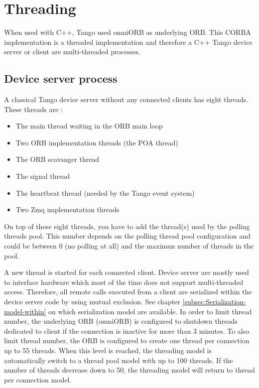 \section{Threading\label{sec:Threading}}

When used with C++, Tango used omniORB as underlying ORB. This CORBA
implementation is a threaded implementation and therefore a C++ Tango
device server or client are multi-threaded processes.

\subsection{Device server process}

A classical Tango device server without any connected clients has
eight threads. These threads are :
\begin{itemize}
\item The main thread waiting in the ORB main loop
\item Two ORB implementation threads (the POA thread)
\item The ORB scavanger thread
\item The signal thread
\item The heartbeat thread (needed by the Tango event system)
\item Two Zmq implementation threads
\end{itemize}
On top of these eight threads, you have to add the thread(s) used
by the polling threads pool. This number depends on the polling thread
pool configuration and could be between 0 (no polling at all) and
the maximun number of threads in the pool.

A new thread is started for each connected client. Device server are
mostly used to interface hardware which most of the time does not
support multi-threaded access. Therefore, all remote calls executed
from a client are serialized within the device server code by using
mutual exclusion. See chapter \ref{subsec:Serialization-model-within}
on which serialization model are available. In order to limit thread
number, the underlying ORB (omniORB) is configured to shutdown threads
dedicated to client if the connection is inactive for more than 3
minutes. To also limit thread number, the ORB is configured to create
one thread per connection up to 55 threads. When this level is reached,
the threading model is automatically switch to a \textquotedbl{}thread
pool\textquotedbl{} model with up to 100 threads. If the number of
threads decrease down to 50, the threading model will return to \textquotedbl{}thread
per connection\textquotedbl{} model.

